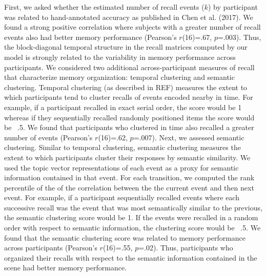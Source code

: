 \documentclass{article}
\begin{document}
{First, we asked whether the estimated number of recall events ($k$) by participant was related to hand-annotated accuracy as published in Chen et al. (2017).  We found a strong positive correlation where subjects with a greater number of recall events also had better memory performance (Pearson's $r$(16)=.67, $p$=.003). Thus, the block-diagonal temporal structure in the recall matrices computed by our model is strongly related to the variability in memory performance across participants.  We considered two additional across-participant measures of recall that characterize memory organization: temporal clustering and semantic clustering. Temporal clustering (as described in REF) measures the extent to which participants tend to cluster recalls of events encoded nearby in time.  For example, if a participant recalled in exact serial order, the score would be 1 whereas if they sequentially recalled randomly positioned items the score would be ~.5.  We found that participants who clustered in time also recalled a greater number of events (Pearson's $r$(16)=.62, $p$=.007). Next, we assessed semantic clustering.  Similar to temporal clustering, semantic clustering measures the extent to which participants cluster their responses by semantic similarity.  We used the topic vector representations of each event as a proxy for semantic information contained in that event.  For each transition, we computed the rank percentile of the of the correlation between the the current event and then next event. For example, if a participant sequentially recalled events where each successive recall was the event that was most semantically similar to the previous, the semantic clustering score would be 1.  If the events were recalled in a random order with respect to semantic information, the clustering score would be ~.5. We found that the semantic clustering score was related to memory performance across participants (Pearson's $r$(16)=.55, $p$=.02).  Thus, participants who organized their recalls with respect to the semantic information contained in the scene had better memory performance.

}
\end{document}
